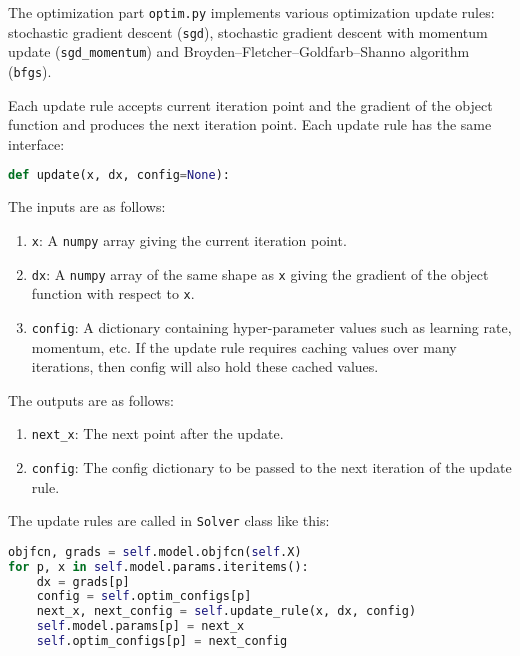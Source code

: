 
The optimization part \texttt{optim.py} implements various optimization update
rules: stochastic gradient descent (\texttt{sgd}), stochastic gradient descent
with momentum update (\texttt{sgd\_momentum}) and
Broyden–Fletcher–Goldfarb–Shanno algorithm (\texttt{bfgs}). 

Each update rule accepts current iteration point and the gradient of the object
function and produces the next iteration point. Each update rule has the same
interface:
\begin{lstlisting}[language=Python]
def update(x, dx, config=None):
\end{lstlisting}
The inputs are as follows:
\begin{enumerate}
  \item \texttt{x}:
    A \texttt{numpy} array giving the current iteration point.
  \item \texttt{dx}:
    A \texttt{numpy} array of the same shape as \texttt{x} giving the gradient
    of the object function with respect to \texttt{x}.
  \item \texttt{config}:
    A dictionary containing hyper-parameter values such as learning rate,
    momentum, etc. If the update rule requires caching values over many
    iterations, then config will also hold these cached values.
\end{enumerate}
The outputs are as follows:
\begin{enumerate}
  \item \texttt{next\_x}:
    The next point after the update.
  \item \texttt{config}:
    The config dictionary to be passed to the next iteration of the update rule.
\end{enumerate}

The update rules are called in \texttt{Solver} class like this:
\begin{lstlisting}[language=Python]
objfcn, grads = self.model.objfcn(self.X)
for p, x in self.model.params.iteritems():
    dx = grads[p]
    config = self.optim_configs[p]
    next_x, next_config = self.update_rule(x, dx, config)
    self.model.params[p] = next_x
    self.optim_configs[p] = next_config
\end{lstlisting}

